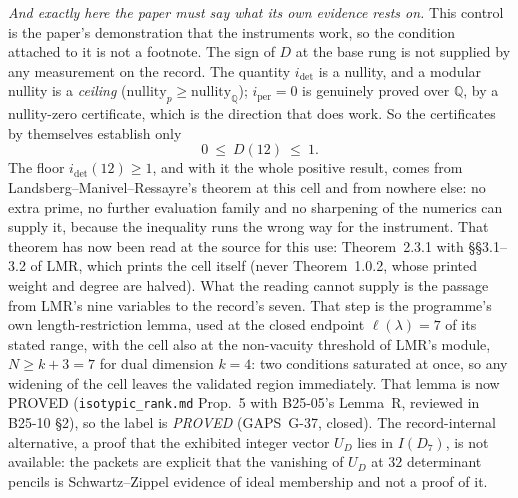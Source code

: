 \documentclass[11pt]{amsart}
\theoremstyle{plain}
\theoremstyle{definition}
\theoremstyle{remark}
\DeclareMathOperator{\per}{per}
\newcommand{\bQ}{\mathbb{Q}}
\newcommand{\prov}[3]{\par\smallskip\noindent{\footnotesize\textsf{[\,label: #1\ \textbar\ source: #2\ \textbar\ lineage: #3\,]}}\par\smallskip}
\newcommand{\cm}[1]{\texttt{#1}}
\begin{document}
\emph{And exactly here the paper must say what its own evidence rests on.} This control is the
paper's demonstration that the instruments work, so the condition attached to it is not a
footnote. The sign of $D$ at the base rung is not supplied by any measurement on the record. The
quantity $i_{\det}$ is a nullity, and a modular nullity is a \emph{ceiling}
($\mathrm{nullity}_p\ge\mathrm{nullity}_\bQ$); $i_{\per}=0$ is genuinely proved over $\bQ$, by a
nullity-zero certificate, which is the direction that does work. So the certificates by
themselves establish only
\[
0\ \le\ D(12)\ \le\ 1 .
\]
The floor $i_{\det}(12)\ge1$, and with it the whole positive result, comes from
Landsberg--Manivel--Ressayre's theorem at this cell and from nowhere else: no extra prime, no
further evaluation family and no sharpening of the numerics can supply it, because the inequality
runs the wrong way for the instrument. That theorem has now been read at the source for this
use: Theorem~2.3.1 with \S\S3.1--3.2 of LMR, which prints the cell itself (never Theorem~1.0.2,
whose printed weight and degree are halved). What the reading cannot supply is the passage from
LMR's nine variables to the record's seven. That step is the programme's own length-restriction lemma,
used at the closed endpoint $\ell(\lambda)=7$ of its stated range, with the cell also at the
non-vacuity threshold of LMR's module, $N\ge k+3=7$ for dual dimension $k=4$: two conditions
saturated at once, so any widening of the cell
leaves the validated region immediately. That lemma is now PROVED (\texttt{isotypic\_rank.md} Prop.~5 with B25-05's Lemma~R, reviewed in
B25-10 \S2), so the label is \emph{PROVED}
(GAPS~G-37, closed). The record-internal alternative, a proof that the exhibited integer vector
$U_D$ lies in $I(D_7)$, is not available: the packets are explicit that the vanishing of $U_D$ at
$32$ determinant pencils is Schwartz--Zippel evidence of ideal membership and not a proof of it.
\prov{scope sentence, not a result. The one-sidedness is the record's own: ``$i_{\det}(12)\le1$ is the measured nullity $1$ at both primes''; the floor is ``LMR's theorem at this cell (adopted)''; and ``finite-point vanishing is Schwartz--Zippel evidence \dots\ the rigorous $v\in I(D_7)$ at $\delta=12$ is LMR''. The read-status and the length-restriction lemma are as in the provenance of Theorem~\ref{thm:ladder}}{\texttt{docs/s73\_report.md} \S1, \S2(c), \S3, \S8 @ \cm{82633a60}; B23-10 \S7 rank~1, ruling B23-10.20 @ \cm{239dd6e8}; B24-02b \S\S2.4, 3.1--3.3 @ \cm{5a97317e}; B24-10 \S3.2, rulings 11.3.3--11.3.8 @ \cm{ab2f8a40}; B25-10 \S2 @ \cm{42e7f4ba}}{producer (session 73) for the quoted sentences; reviewer B23-10 (READ) for the earlier CONDITIONAL ruling, now discharged as to read-status; reviewer B24-10 (READ) for the double pinch and the earlier qualifier; reviewer B25-10 (READ + INDEPENDENT) for the length-restriction lemma and PROVED}
\end{document}
